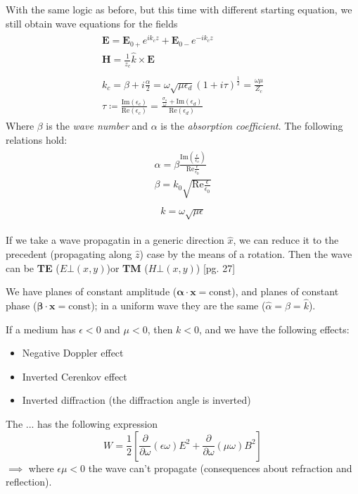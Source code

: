 \documentclass[a4paper, twocolumn]{article}
\begin{document}
With the same logic as before, but this time with different starting equation, we still obtain wave equations for the fields
\begin{gather}
  \label{eq:55}
  \begin{aligned}
    \mathbf{E}=\mathbf{E}_{0+}e^{ik_cz}+\mathbf{E}_{0-}e^{-ik_cz} \\
    \mathbf{H}=\frac{1}{z_c}\hat{k}\times\mathbf{E} \qquad
  \end{aligned}\\
  \begin{aligned}
    k_c=\beta+i \frac{\alpha}{2}=\omega\sqrt{\mu\epsilon_d}(1+i\tau)^{\frac{1}{2}}=\frac{\omega\mu}{Z_c} \\
    \tau\coloneqq\frac{\mathrm{Im}(\epsilon_c)}{\mathrm{Re}(\epsilon_c)} =\frac{\frac{\sigma_s}{\omega}+\mathrm{Im}(\epsilon_d)}{\mathrm{Re}(\epsilon_d)}
  \end{aligned}
\end{gather}
Where $\beta$ is the \emph{wave number} and $\alpha$ is the \emph{absorption coefficient}. The following relations hold:
\begin{gather}
  \label{eq:57}
  \begin{split}
    \alpha=\beta \frac{\mathrm{Im}(\frac{\epsilon}{\epsilon_o})}{\mathrm{Re}\frac{\epsilon}{\epsilon_0}} \\
    \beta=k_0\sqrt{\mathrm{Re}\frac{\epsilon}{\epsilon_0}}
  \end{split}
\end{gather}
\begin{gather}
  \label{eq:58}
  \begin{split}
    k=\omega\sqrt{\mu\epsilon}
  \end{split}
\end{gather}

If we take a wave propagatin in a generic direction $\hat{x}$, we can reduce it to the precedent (propagating along $\hat{z}$) case by the means of a rotation. Then the wave can be \textbf{TE} ($E\bot(x,y) $)or \textbf{TM} ($H\bot(x,y)$) [pg. 27]

We have planes of constant amplitude ($\mathbf{\alpha}\cdot\mathbf{x}=\text{const}$), and planes of constant phase ($\mathbf{\beta}\cdot\mathbf{x}=\text{const}$); in a uniform wave they are the same ($\hat{\alpha}=\hat{\beta}=\hat{k}$).

If a medium has $\epsilon<0$ and $\mu<0$, then $k<0$, and we have the following effects:
\begin{itemize}
\item Negative Doppler effect
\item Inverted Cerenkov effect
\item Inverted diffraction (the diffraction angle is inverted)
\end{itemize}
The ... has the following expression
\begin{equation}
  \label{eq:60}
  W=\frac{1}{2}\left[\frac{\partial}{\partial\omega}(\epsilon\omega)E^2+\frac{\partial}{\partial\omega}(\mu\omega)B^2\right]
\end{equation}
$\implies$ where $\epsilon\mu<0$ the wave can't propagate (consequences about refraction and reflection).
\end{document}
